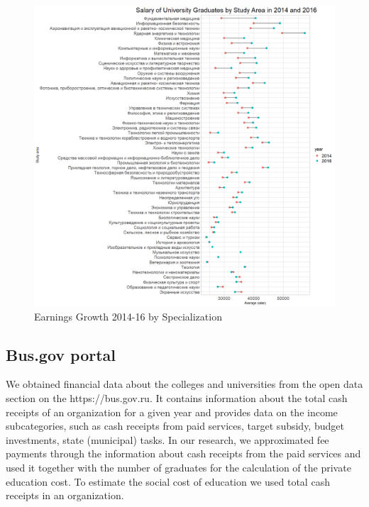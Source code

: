 \documentclass[alpha-refs]{wiley-article-05g}
\begin{document}
\begin{figure}[H]
	\centering
	\includegraphics[width=400pt]{sal_inc.png}
	\caption{Earnings Growth 2014-16 by Specialization}\label{fig:1.2}
\end{figure}



\subsection{Bus.gov portal}

We obtained financial data about the colleges and universities from the open data section on the https://bus.gov.ru. It contains information about the total cash receipts of an organization for a given year and provides data on the income subcategories, such as cash receipts from paid services, target subsidy, budget investments, state (municipal) tasks. In our research, we approximated fee payments through the information about cash receipts from the paid services and used it together with the number of graduates for the calculation of the private education cost. To estimate the social cost of education we used total cash receipts in an organization. 
\end{document}
